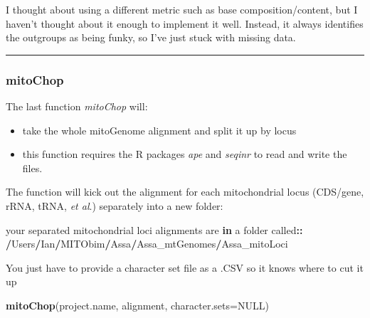 \documentclass[]{article}
\newenvironment{Shaded}{\begin{snugshade}}{\end{snugshade}}
\newcommand{\ControlFlowTok}[1]{\textcolor[rgb]{0.13,0.29,0.53}{\textbf{#1}}}
\newcommand{\DataTypeTok}[1]{\textcolor[rgb]{0.13,0.29,0.53}{#1}}
\newcommand{\ErrorTok}[1]{\textcolor[rgb]{0.64,0.00,0.00}{\textbf{#1}}}
\newcommand{\KeywordTok}[1]{\textcolor[rgb]{0.13,0.29,0.53}{\textbf{#1}}}
\newcommand{\NormalTok}[1]{#1}
\newcommand{\OperatorTok}[1]{\textcolor[rgb]{0.81,0.36,0.00}{\textbf{#1}}}
\newcommand{\OtherTok}[1]{\textcolor[rgb]{0.56,0.35,0.01}{#1}}
\newcommand{\StringTok}[1]{\textcolor[rgb]{0.31,0.60,0.02}{#1}}
\providecommand{\tightlist}{%
  \setlength{\itemsep}{0pt}\setlength{\parskip}{0pt}}
\renewcommand{\linethickness}{0.05em}
\begin{document}
I thought about using a different metric such as base
composition/content, but I haven't thought about it enough to implement
it well. Instead, it always identifies the outgroups as being funky, so
I've just stuck with missing data.

\begin{center}\rule{0.5\linewidth}{\linethickness}\end{center}

\hypertarget{mitochop}{%
\subsubsection{mitoChop}\label{mitochop}}

The last function \emph{mitoChop} will:

\begin{itemize}
\tightlist
\item
  take the whole mitoGenome alignment and split it up by locus\\
\item
  this function requires the R packages \emph{ape} and \emph{seqinr} to
  read and write the files.
\end{itemize}

The function will kick out the alignment for each mitochondrial locus
(CDS/gene, rRNA, tRNA, \emph{et al}.) separately into a new folder:

\begin{Shaded}
\begin{Highlighting}[]
\NormalTok{your separated mitochondrial loci alignments are }\ControlFlowTok{in}\NormalTok{ a folder called}\OperatorTok{::}
\StringTok{ }\ErrorTok{/}\NormalTok{Users}\OperatorTok{/}\NormalTok{Ian}\OperatorTok{/}\NormalTok{MITObim}\OperatorTok{/}\NormalTok{Assa}\OperatorTok{/}\NormalTok{Assa_mtGenomes}\OperatorTok{/}\NormalTok{Assa_mitoLoci}
\end{Highlighting}
\end{Shaded}

You just have to provide a character set file as a .CSV so it knows
where to cut it up

\begin{Shaded}
\begin{Highlighting}[]
\KeywordTok{mitoChop}\NormalTok{(project.name, alignment, }\DataTypeTok{character.sets=}\OtherTok{NULL}\NormalTok{)}
\end{Highlighting}
\end{Shaded}
\end{document}
